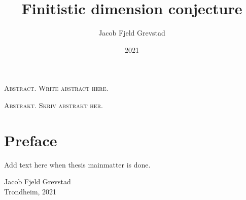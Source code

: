 \documentclass[11pt, english, twoside]{article}
\theoremstyle{definition}
\begin{document}
\title{Finitistic dimension conjecture}
\author{Jacob Fjeld Grevstad}
\date{2021}
{}

%
\noindent \scshape\mdseries Abstract. \normalfont
Write abstract here. \lipsum[1] 

\noindent \scshape\mdseries Abstrakt. \normalfont
Skriv abstrakt her. \lipsum[2] 
\clearpage

\section*{Preface}
%
Add text here when thesis mainmatter is done. 
\begin{flushright}
	Jacob Fjeld Grevstad\\ 
	Trondheim, 2021
\end{flushright}
\clearpage

\tableofcontents
{}%
\clearpage



\newpage












%

















\begin{appendices}

\end{appendices}
\end{document}
